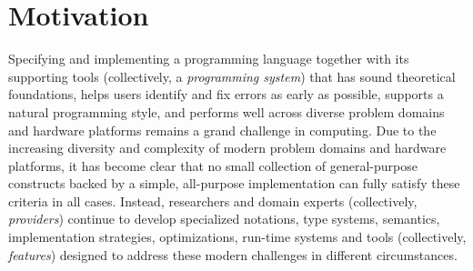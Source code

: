 \vspace{-25pt}
\section{Motivation}\label{motivation}
Specifying and implementing a programming language together with its supporting tools (collectively, a \emph{programming system}) that has sound theoretical foundations, helps users identify and fix errors as early as possible, supports a natural programming style, and performs well across diverse problem domains and hardware platforms remains a grand challenge in computing. Due to the increasing diversity and complexity of modern problem domains and hardware platforms, it has become clear that no small  collection of general-purpose constructs backed by a simple, all-purpose implementation can fully satisfy these criteria in all cases. Instead,  researchers and domain experts (collectively, \emph{providers}) continue to develop  specialized notations,  type systems, semantics, implementation strategies, optimizations, run-time systems and tools (collectively, \emph{features})  designed to address these modern challenges in different circumstances. %


